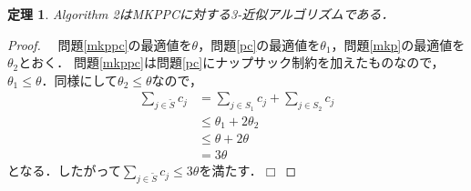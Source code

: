 \documentclass[twocolumn,10pt,dvipdfmx]{jarticle}
\numberwithin{equation}{section}
\newtheorem{theorem}{定理}[section]
\newtheorem{proof}{証明}
\def\qed{\hfill $\Box$}
\begin{document}
	\begin{theorem}
		\rm Algorithm 2はMKPPCに対する3-近似アルゴリズムである．
	\end{theorem}
	\begin{proof}
		\rm　問題\eqref{mkppc}の最適値を$\theta$，問題\eqref{pc}の最適値を$\theta_1$，問題\eqref{mkp}の最適値を$\theta_2$とおく．
		問題\eqref{mkppc}は問題\eqref{pc}にナップサック制約を加えたものなので，
		$\theta_1\le\theta$．同様にして$\theta_2\le\theta$なので，
		\begin{align}    
			\sum_{j\in \tilde{S}}{c_j} &=   \sum_{j\in S_1}{c_j}+\sum_{j\in S_2}{c_j}\\  
									   &\le \theta_1 + 2\theta_2\\
									   &\le \theta + 2\theta\\
									   &=   3\theta
			\label{p2}
		\end{align}
		となる．したがって$\sum_{j\in \tilde{S}}{c_j}\le3\theta$を満たす．\qed
	\end{proof}
\end{document}
